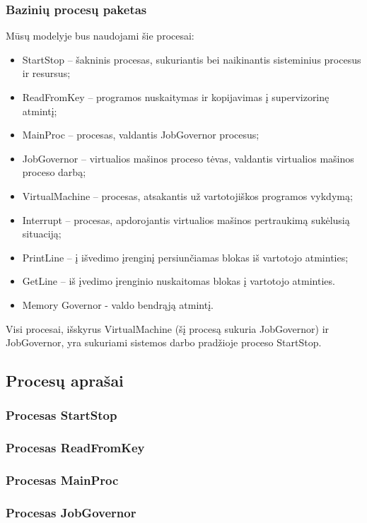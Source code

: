 \subsubsection{Bazinių procesų paketas}
Mūsų modelyje bus naudojami šie procesai:
	\begin{itemize}
		\item StartStop – šakninis procesas, sukuriantis bei naikinantis sisteminius procesus ir resursus;
		\item ReadFromKey – programos nuskaitymas ir kopijavimas į supervizorinę atmintį;
		\item MainProc – procesas, valdantis JobGovernor procesus;
		\item JobGovernor – virtualios mašinos proceso tėvas, valdantis virtualios mašinos proceso darbą;
		\item VirtualMachine – procesas, atsakantis už vartotojiškos programos vykdymą;
		\item Interrupt – procesas, apdorojantis virtualios mašinos pertraukimą sukėlusią situaciją;
		\item PrintLine – į išvedimo įrenginį persiunčiamas blokas iš vartotojo atminties;
		\item GetLine – iš įvedimo įrenginio nuskaitomas blokas į vartotojo atminties.
		\item Memory Governor - valdo bendrąją atmintį.
	\end{itemize}
Visi procesai, išskyrus VirtualMachine (šį procesą sukuria JobGovernor) ir JobGovernor, yra sukuriami sistemos darbo pradžioje proceso StartStop.

\subsection{Procesų aprašai}

\subsubsection{Procesas StartStop}

\subsubsection{Procesas ReadFromKey}

\subsubsection{Procesas MainProc}

\subsubsection{Procesas JobGovernor}

